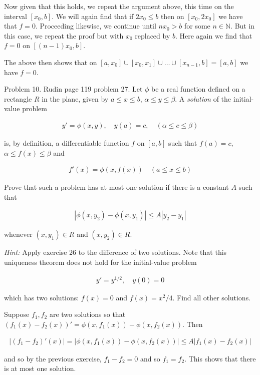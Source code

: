 \documentclass{article}
\begin{document}
  Now given that this holds, we repeat the argument above, this time on the interval $[x_0,b]$.  We will again find that if $2x_0 \leq b$ then on $[x_0,2x_0]$ we have that $f=0$.  Proceeding likewise, we continue until $nx_0>b$ for some $n\in\mathbb N$.  But in this case, we repeat the proof but with $x_0$ replaced by $b$.  Here again we find that $f=0$ on $[(n-1)x_0,b]$.

  The above then shows that on $[a,x_0]\cup[x_0,x_1]\cup\dots\cup[x_{n-1},b]=[a,b]$ we have $f=0$.

  \pagebreak

  {\Large \color{Sepia} Problem 10. Rudin page 119 problem 27. Let $\phi$ be a real function defined on a rectangle $R$ in the plane, given by $a\leq x\leq b$, $\alpha\leq y\leq \beta$.  A {\it solution} of the initial-value problem

  \begin{align*}
    y' = \phi(x,y), \quad y(a)=c, \quad (\alpha\leq c\leq \beta)
  \end{align*}

  is, by definition, a differentiable function $f$ on $[a,b]$ such that $f(a)=c$, $\alpha\leq f(x)\leq \beta$ and

  \begin{align*}
    f'(x)=\phi(x,f(x)) \quad (a\leq x\leq b)
  \end{align*}

  Prove that such a problem has at most one solution if there is a constant $A$ such that

  \begin{align*}
    |\phi(x,y_2)-\phi(x,y_1)|\leq A|y_2-y_1|
  \end{align*}

  whenever $(x,y_1)\in R$ and $(x,y_2)\in R$.

  {\it Hint:} Apply exercise 26 to the difference of two solutions.  Note that this uniqueness theorem does not hold for the initial-value problem

  \begin{align*}
    y'=y^{1/2}, \quad y(0)=0
  \end{align*}

  which has two solutions: $f(x)=0$ and $f(x)=x^2/4$.  Find all other solutions.

  }

  \vspace{1cm}

  Suppose $f_1, f_2$ are two solutions so that $(f_1(x)-f_2(x))' = \phi(x,f_1(x))-\phi(x,f_2(x))$.  Then

  \begin{align*}
    |(f_1-f_2)'(x)| = |\phi(x,f_1(x))-\phi(x,f_2(x))| \leq A|f_1(x)-f_2(x)|
  \end{align*}

  and so by the previous exercise, $f_1-f_2=0$ and so $f_1=f_2$.  This shows that there is at most one solution.

  \pagebreak
\end{document}
